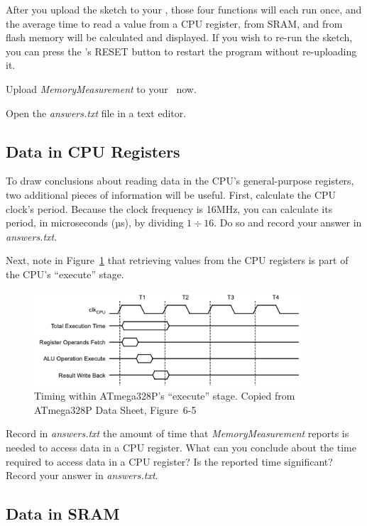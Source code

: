 After you upload the sketch to your \nano, those four functions will each run
once, and the average time to read a value from a CPU register, from SRAM, and
from flash memory will be calculated and displayed. If you wish to re-run the
sketch, you can press the \nano's RESET button to restart the program without
re-uploading it.

Upload \textit{MemoryMeasurement} to your \nano\ now.

\vspace{.5cm}

Open the \textit{answers.txt} file in a text editor.

\subsection{Data in CPU Registers}

To draw conclusions about reading data in the CPU's general-purpose registers,
two additional pieces of information will be useful. First, calculate the CPU
clock's period. Because the clock frequency is 16MHz, you can calculate its
period, in microseconds (µs), by dividing $1 \div 16$. Do so and record your
answer in \textit{answers.txt}.

Next, note in Figure~\ref{fig:AluTiming} that retrieving values from
the CPU registers is part of the CPU's ``execute'' stage.

\begin{figure}
    \centering
    \includegraphics[width=10cm]{ATmega328P_AluTiming}
    \caption{Timing within ATmega328P's ``execute'' stage. \tiny Copied from ATmega328P Data Sheet, Figure~6-5 \label{fig:AluTiming}}
\end{figure}

Record in \textit{answers.txt} the amount of time that
\textit{MemoryMeasurement} reports is needed to access data in a CPU
register. What can you conclude about the time required to access data in a CPU
register? Is the reported time significant? Record your answer in
\textit{answers.txt}.

\subsection{Data in SRAM}


